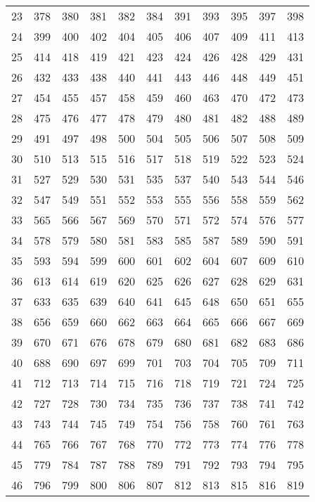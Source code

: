 \begin{longtable}{|r|rrrrrrrrrr|}
  23 & 378 & 380 & 381 & 382 & 384 & 391 & 393 & 395 & 397 & 398 \\ 
  24 & 399 & 400 & 402 & 404 & 405 & 406 & 407 & 409 & 411 & 413 \\ 
  25 & 414 & 418 & 419 & 421 & 423 & 424 & 426 & 428 & 429 & 431 \\ 
  26 & 432 & 433 & 438 & 440 & 441 & 443 & 446 & 448 & 449 & 451 \\ 
  27 & 454 & 455 & 457 & 458 & 459 & 460 & 463 & 470 & 472 & 473 \\ 
  28 & 475 & 476 & 477 & 478 & 479 & 480 & 481 & 482 & 488 & 489 \\ 
  29 & 491 & 497 & 498 & 500 & 504 & 505 & 506 & 507 & 508 & 509 \\ 
  30 & 510 & 513 & 515 & 516 & 517 & 518 & 519 & 522 & 523 & 524 \\ 
  31 & 527 & 529 & 530 & 531 & 535 & 537 & 540 & 543 & 544 & 546 \\ 
  32 & 547 & 549 & 551 & 552 & 553 & 555 & 556 & 558 & 559 & 562 \\ 
  33 & 565 & 566 & 567 & 569 & 570 & 571 & 572 & 574 & 576 & 577 \\ 
  34 & 578 & 579 & 580 & 581 & 583 & 585 & 587 & 589 & 590 & 591 \\ 
  35 & 593 & 594 & 599 & 600 & 601 & 602 & 604 & 607 & 609 & 610 \\ 
  36 & 613 & 614 & 619 & 620 & 625 & 626 & 627 & 628 & 629 & 631 \\ 
  37 & 633 & 635 & 639 & 640 & 641 & 645 & 648 & 650 & 651 & 655 \\ 
  38 & 656 & 659 & 660 & 662 & 663 & 664 & 665 & 666 & 667 & 669 \\ 
  39 & 670 & 671 & 676 & 678 & 679 & 680 & 681 & 682 & 683 & 686 \\ 
  40 & 688 & 690 & 697 & 699 & 701 & 703 & 704 & 705 & 709 & 711 \\ 
  41 & 712 & 713 & 714 & 715 & 716 & 718 & 719 & 721 & 724 & 725 \\ 
  42 & 727 & 728 & 730 & 734 & 735 & 736 & 737 & 738 & 741 & 742 \\ 
  43 & 743 & 744 & 745 & 749 & 754 & 756 & 758 & 760 & 761 & 763 \\ 
  44 & 765 & 766 & 767 & 768 & 770 & 772 & 773 & 774 & 776 & 778 \\ 
  45 & 779 & 784 & 787 & 788 & 789 & 791 & 792 & 793 & 794 & 795 \\ 
  46 & 796 & 799 & 800 & 806 & 807 & 812 & 813 & 815 & 816 & 819 \\ 

\end{longtable}
